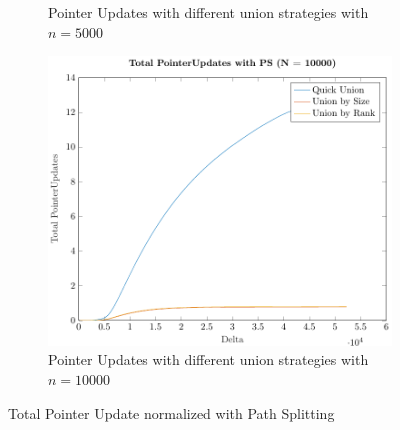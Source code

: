 \begin{figure}[ht]
\begin{subfigure}{0.32\textwidth}
        \caption{Pointer Updates with different union strategies with $n = 5000$}
    \end{subfigure}%
    \hfill
    \begin{subfigure}{0.32\textwidth}
        \centering
        \includegraphics[width=\textwidth]{../images/plotPSFull10000_PointerUpdates.pdf}
        \caption{Pointer Updates with different union strategies with $n = 10000$}
    \end{subfigure}

    \caption{Total Pointer Update normalized with Path Splitting}
    \label{fig:tpuPS}
\end{figure}


